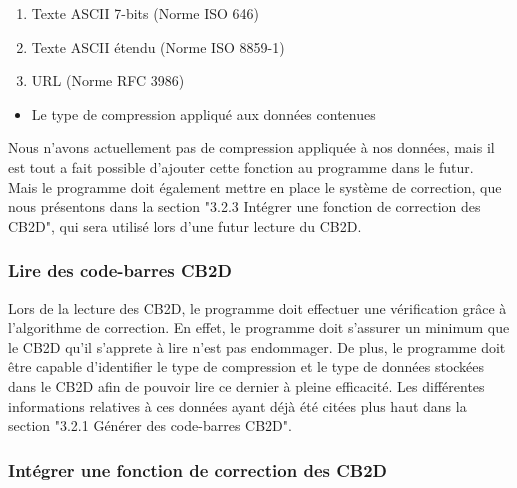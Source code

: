 	\begin{enumerate}
	\item Texte ASCII 7-bits (Norme ISO 646)
	\item Texte ASCII étendu (Norme ISO 8859-1)
	\item URL (Norme RFC 3986)
	\end{enumerate}

\begin{itemize}
\item Le type de compression appliqué aux données contenues
\end{itemize}

Nous n'avons actuellement pas de compression appliquée à nos données, mais il est tout a fait possible d'ajouter cette fonction au programme dans le futur. \\

Mais le programme doit également mettre en place le système de correction, que nous présentons dans la section "3.2.3 Intégrer une fonction de correction des CB2D", qui sera utilisé lors d'une futur lecture du CB2D.

\subsubsection{Lire des code-barres CB2D}

Lors de la lecture des CB2D, le programme doit effectuer une vérification grâce à l'algorithme de correction. En effet, le programme doit s'assurer un minimum que le CB2D qu'il s'apprete à lire n'est pas endommager.
De plus, le programme doit être capable d'identifier le type de compression et le type de données stockées dans le CB2D afin de pouvoir lire ce dernier à pleine efficacité. Les différentes informations relatives à ces données ayant déjà été citées plus haut dans la section "3.2.1 Générer des code-barres CB2D".

\subsubsection{Intégrer une fonction de correction des CB2D}

